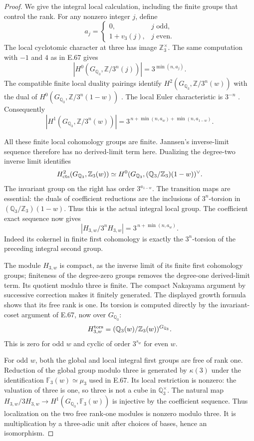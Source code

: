 \begin{proof}
We give the integral local calculation, including the
finite groups that control the rank. For any nonzero
integer $j$, define
\[
 a_j=
 \begin{cases}
  0,&j\text{ odd},\\
  1+v_3(j),&j\text{ even}.
 \end{cases}
\]
The local cyclotomic character at three has image
$\mathbb Z_3^\times$. The same computation with $-1$
and $4$ as in E.67 gives
\[
 \left|H^0(G_{\mathbb Q_3},\mathbb Z/3^n(j))\right|
       =3^{\min(n,a_j)}.
\]
The compatible finite local duality pairings identify
$H^2(G_{\mathbb Q_3},\mathbb Z/3^n(w))$
with the dual of
$H^0(G_{\mathbb Q_3},\mathbb Z/3^n(1-w))$
\cite[I.2.3, p.28]{CohMilneADT}.
The local Euler characteristic is $3^{-n}$
\cite[I.2.8, p.31]{CohMilneADT}. Consequently
\[
 \left|H^1(G_{\mathbb Q_3},\mathbb Z/3^n(w))\right|
       =3^{\,n+\min(n,a_w)+\min(n,a_{1-w})}.
\]

All these finite local cohomology groups are finite.
Jannsen's inverse-limit sequence therefore has no
derived-limit term here. Dualizing the degree-two
inverse limit identifies
\[
 H^2_{\rm cts}(G_{\mathbb Q_3},\mathbb Z_3(w))
 \simeq
 H^0(G_{\mathbb Q_3},
          (\mathbb Q_3/\mathbb Z_3)(1-w))^\vee .
\]
The invariant group on the right has order $3^{a_{1-w}}$.
The transition maps are essential: the duals of
coefficient reductions are the inclusions of
$3^n$-torsion in $(\mathbb Q_3/\mathbb Z_3)(1-w)$.
Thus this is the actual integral local group.
The coefficient exact sequence now gives
\[
 \left|H_{3,w}/3^nH_{3,w}\right|
       =3^{\,n+\min(n,a_w)}.
\]
Indeed its cokernel in finite first cohomology is
exactly the $3^n$-torsion of the preceding integral
second group.

The module $H_{3,w}$ is compact, as the inverse limit
of its finite first cohomology groups; finiteness of
the degree-zero groups removes the degree-one
derived-limit term. Its quotient modulo three is
finite. The compact Nakayama argument by successive
correction makes it finitely generated.
The displayed growth formula shows that its free
rank is one. Its torsion is computed directly by
the invariant-coset argument of E.67, now over
$G_{\mathbb Q_3}$:
\[
 H_{3,w}^{\rm tors}
   =(\mathbb Q_3(w)/\mathbb Z_3(w))^{G_{\mathbb Q_3}}.
\]
This is zero for odd $w$ and cyclic of order
$3^{s_w}$ for even $w$.

For odd $w$, both the global and local integral first
groups are free of rank one. Reduction of the global
group modulo three is generated by $\kappa(3)$
under the identification
$\mathbb F_3(w)\simeq\mu_3$ used in E.67.
Its local restriction is nonzero: the valuation of
three is one, so three is not a cube in
$\mathbb Q_3^\times$. The natural map
$H_{3,w}/3H_{3,w}\to
H^1(G_{\mathbb Q_3},\mathbb F_3(w))$ is injective
by the coefficient sequence.
Thus localization on the two free rank-one modules
is nonzero modulo three. It is multiplication by
a three-adic unit after choices of bases, hence an
isomorphism.


\end{proof}
